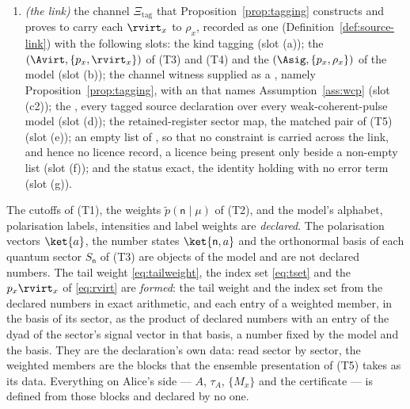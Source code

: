 \begin{definition}
\begin{enumerate}[label=(T\arabic*),leftmargin=3.0em]
(Proposition~\ref{prop:decoy-cert}\,(iii)). The matched pair
$(\{\Pi^{A}_t\},\{\Pi^{\mathrm v}_t\})$, with $\Pi^{A}_t$ the projectors onto
Alice's sectors (Definition~\ref{def:source-spec}), is the structure of (T3)
read on both sides. It is the  of the link of
(T6), the slot (e) of Definition~\ref{def:source-link}, which fixes how the
certificate, $\tau_A$ and $\{M_x\}$ are presented, sector by sector. It is a
statement about those three objects only: it does not assert that any joint
state of $A$ and another system is block diagonal
(Definition~\ref{def:source-spec}).
\item \emph{(the link)} the channel $\Xi_{\mathrm{tag}}$ that
Proposition~\ref{prop:tagging} constructs and proves to carry each $\rvirt_x$
to $\rho_x$, recorded as one 
(Definition~\ref{def:source-link}) with the following slots: the kind
\textsf{tagging} (slot (a)); the 
$(\Avirt,\{p_x,\rvirt_x\})$ of (T3) and (T4) and the 
$(\Asig,\{p_x,\rho_x\})$ of the model (slot (b)); the channel witness supplied
as a , namely Proposition~\ref{prop:tagging}, with an
 that names Assumption~\ref{ass:wcp} (slot (c2)); the
, every tagged source declaration over every
weak-coherent-pulse model (slot (d)); the retained-register sector map, the
matched pair of (T5) (slot (e)); an empty list of
, so that no constraint is carried
across the link, and hence no licence record, a licence being present only
beside a non-empty list (slot (f)); and the status \textsf{exact}, the identity
holding with no error term (slot (g)).
\end{enumerate}
The cutoffs of (T1), the weights $\tilde p(\mathsf{n}\mid\mu)$ of (T2), and the
model's alphabet, polarisation labels, intensities and label weights are
\emph{declared}. The polarisation vectors $\ket{a}$, the number states
$\ket{\mathsf{n},a}$ and the orthonormal basis of each quantum sector
$S_{\mathsf{n}}$ of (T3) are objects of the model and are not declared
numbers. The tail weight \eqref{eq:tailweight}, the index set \eqref{eq:tset}
and the  $p_x\rvirt_x$ of \eqref{eq:rvirt} are
\emph{formed}: the tail weight and the index set from the declared numbers in
exact arithmetic, and each entry of a weighted member, in the basis of its
sector, as the product of declared numbers with an entry of the dyad of the
sector's signal vector in that basis, a number fixed by the model and the
basis. They are the declaration's own data: read sector by sector, the
weighted members are the blocks that the ensemble presentation of (T5) takes as
its data. Everything on Alice's side --- $A$, $\tau_A$, $\{M_x\}$ and the
certificate --- is defined from those blocks and declared by no one.
\end{definition}
